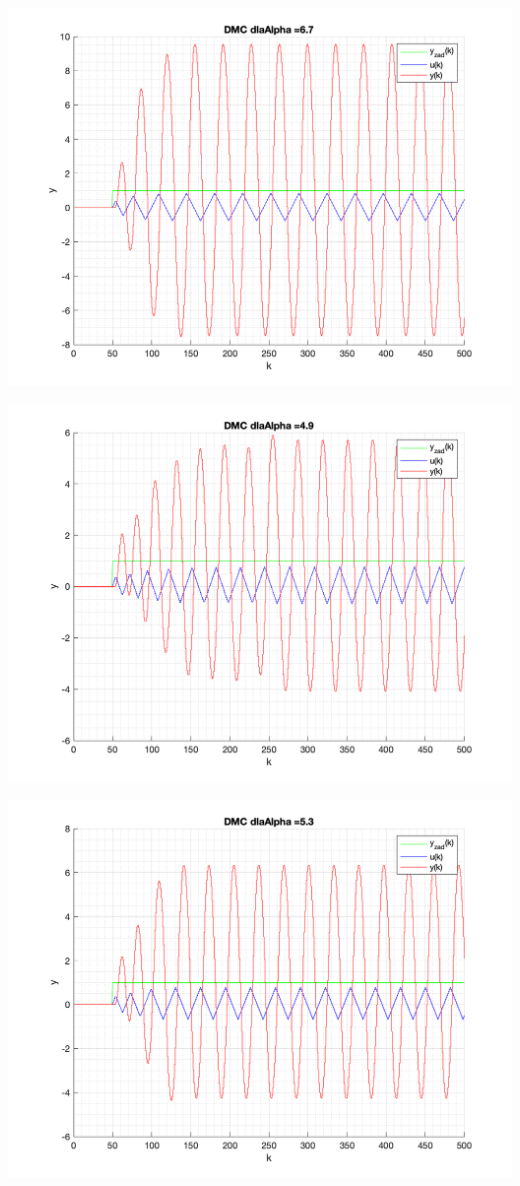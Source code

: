 \documentclass[a4paper, 11pt]{article}
\begin{document}
\begin{enumerate}
 \includegraphics[width=\linewidth]{./ModelsDodatkowe_Alpha/P4_DMC_Alpha_6_7_png.png} 
 
 \includegraphics[width=\linewidth]{./ModelsDodatkowe_Alpha/P4_DMC_Alpha_4_9_png.png} 
 
 \includegraphics[width=\linewidth]{./ModelsDodatkowe_Alpha/P4_DMC_Alpha_5_3_png.png} 
 

\end{enumerate}
\end{document}
